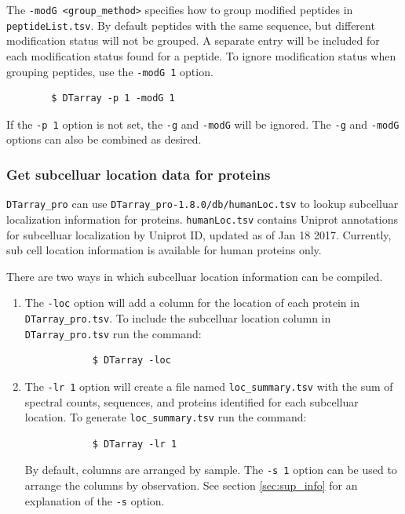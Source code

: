 \documentclass[12pt]{article}
\newcommand{\VERSION}{1.8.0}
\begin{document}
	\noindent
	The \texttt{-modG <group\_method>} specifies how to group modified peptides in \texttt{peptideList.tsv}.  By default peptides  with  the  same sequence, but different modification status will not be grouped. A separate entry will be  included for each modification status found for a peptide. To ignore modification status when grouping peptides, use the \texttt{-modG 1} option.
	
	\begin{lstlisting}
		$ DTarray -p 1 -modG 1
	\end{lstlisting}
	
	\noindent
	If the \texttt{-p 1} option is not set, the \texttt{-g} and \texttt{-modG} will be ignored. The \texttt{-g} and \texttt{-modG} options can also be combined as desired.  
	
	\subsubsection{Get subcelluar location data for proteins} \label{sec:loc}
	
	\texttt{DTarray\_pro} can use \texttt{DTarray\_pro-\VERSION/db/humanLoc.tsv}  to lookup subcelluar localization information for proteins.  \texttt{humanLoc.tsv} contains Uniprot annotations for subcelluar localization by Uniprot ID,	updated as of Jan 18 2017. Currently, sub cell location information
	is available for human proteins only.
	
	\bigskip
	\noindent
	There are two ways in which subcelluar location information can be compiled.
	
	\begin{enumerate}
		\item The \texttt{-loc} option will add a column for the location of each protein in \texttt{DTarray\_pro.tsv}.  To include the subcelluar location column in \texttt{DTarray\_pro.tsv} run the command:
		
		\begin{lstlisting}
			$ DTarray -loc
		\end{lstlisting}

		\item The \texttt{-lr 1} option will create a file named \texttt{loc\_summary.tsv} with the sum of spectral counts, sequences, and proteins identified for each subcelluar location.  To generate \texttt{loc\_summary.tsv} run the command:
		
		\begin{lstlisting}
			$ DTarray -lr 1
		\end{lstlisting}
		
		\noindent
		By default, columns are arranged by sample.  The \texttt{-s 1} option can be used to arrange the columns by observation.  See section \ref{sec:sup_info} for an explanation of the \texttt{-s} option.  
	
	\end{enumerate}
	
\end{document}
